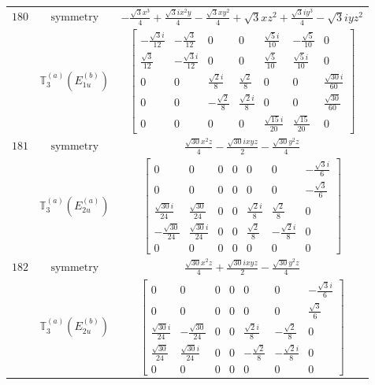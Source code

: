 \documentclass[fleqn,8pt,landscape]{jsarticle}
\begin{document}
\begin{longtable}{ccc}
$ 180 $ & $ \text{symmetry} $ & $ - \frac{\sqrt{3} x^{3}}{4} + \frac{\sqrt{3} i x^{2} y}{4} - \frac{\sqrt{3} x y^{2}}{4} + \sqrt{3} x z^{2} + \frac{\sqrt{3} i y^{3}}{4} - \sqrt{3} i y z^{2} $ \\
$  $ & $ \mathbb{T}_{3}^{(a)}(E_{1u}^{(b)}) $ & $ \begin{bmatrix} - \frac{\sqrt{3} i}{12} & - \frac{\sqrt{3}}{12} & 0 & 0 & \frac{\sqrt{5} i}{10} & - \frac{\sqrt{5}}{10} & 0 \\ \frac{\sqrt{3}}{12} & - \frac{\sqrt{3} i}{12} & 0 & 0 & \frac{\sqrt{5}}{10} & \frac{\sqrt{5} i}{10} & 0 \\ 0 & 0 & \frac{\sqrt{2} i}{8} & \frac{\sqrt{2}}{8} & 0 & 0 & \frac{\sqrt{30} i}{60} \\ 0 & 0 & - \frac{\sqrt{2}}{8} & \frac{\sqrt{2} i}{8} & 0 & 0 & \frac{\sqrt{30}}{60} \\ 0 & 0 & 0 & 0 & \frac{\sqrt{15} i}{20} & \frac{\sqrt{15}}{20} & 0 \end{bmatrix} $ \\ \hline
$ 181 $ & $ \text{symmetry} $ & $ \frac{\sqrt{30} x^{2} z}{4} - \frac{\sqrt{30} i x y z}{2} - \frac{\sqrt{30} y^{2} z}{4} $ \\
$  $ & $ \mathbb{T}_{3}^{(a)}(E_{2u}^{(a)}) $ & $ \begin{bmatrix} 0 & 0 & 0 & 0 & 0 & 0 & - \frac{\sqrt{3} i}{6} \\ 0 & 0 & 0 & 0 & 0 & 0 & - \frac{\sqrt{3}}{6} \\ \frac{\sqrt{30} i}{24} & \frac{\sqrt{30}}{24} & 0 & 0 & \frac{\sqrt{2} i}{8} & \frac{\sqrt{2}}{8} & 0 \\ - \frac{\sqrt{30}}{24} & \frac{\sqrt{30} i}{24} & 0 & 0 & \frac{\sqrt{2}}{8} & - \frac{\sqrt{2} i}{8} & 0 \\ 0 & 0 & 0 & 0 & 0 & 0 & 0 \end{bmatrix} $ \\ \hline
$ 182 $ & $ \text{symmetry} $ & $ \frac{\sqrt{30} x^{2} z}{4} + \frac{\sqrt{30} i x y z}{2} - \frac{\sqrt{30} y^{2} z}{4} $ \\
$  $ & $ \mathbb{T}_{3}^{(a)}(E_{2u}^{(b)}) $ & $ \begin{bmatrix} 0 & 0 & 0 & 0 & 0 & 0 & - \frac{\sqrt{3} i}{6} \\ 0 & 0 & 0 & 0 & 0 & 0 & \frac{\sqrt{3}}{6} \\ \frac{\sqrt{30} i}{24} & - \frac{\sqrt{30}}{24} & 0 & 0 & \frac{\sqrt{2} i}{8} & - \frac{\sqrt{2}}{8} & 0 \\ \frac{\sqrt{30}}{24} & \frac{\sqrt{30} i}{24} & 0 & 0 & - \frac{\sqrt{2}}{8} & - \frac{\sqrt{2} i}{8} & 0 \\ 0 & 0 & 0 & 0 & 0 & 0 & 0 \end{bmatrix} $ \\ \hline

\end{longtable}
\end{document}
